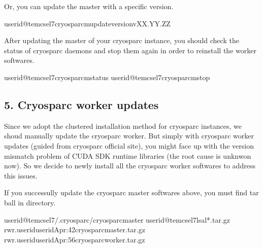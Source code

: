 \documentclass[a4paper,10pt,english]{sphinxmanual}
\begin{document}
\sphinxAtStartPar
Or, you can update the master with a specific version.

\begin{sphinxVerbatim}[commandchars=\\\{\}]
userid@tem\PYGZhy{}cs\PYGZhy{}el7\PYGZdl{}\PYGZgt{}cryosparcmupdate\PYGZhy{}\PYGZhy{}versionvXX.YY.ZZ
\end{sphinxVerbatim}

\sphinxAtStartPar
After updating the master of your cryosparc instance, you should check the status of cryosparc daemons and stop them again in order to re\sphinxhyphen{}install the worker softwares.

\begin{sphinxVerbatim}[commandchars=\\\{\}]
userid@tem\PYGZhy{}cs\PYGZhy{}el7\PYGZdl{}\PYGZgt{}cryosparcmstatus
userid@tem\PYGZhy{}cs\PYGZhy{}el7\PYGZdl{}\PYGZgt{}cryosparcmstop
\end{sphinxVerbatim}


\subsection{5. Cryosparc worker updates}
\label{\detokenize{faq:cryosparc-worker-updates}}
\sphinxAtStartPar
Since we adopt the clustered installation method for cryosparc instances, we shoud manually update the cryosparc worker.
But simply with cryosparc worker updates (guided from cryosparc official site), you might face up with the version mismatch problem of CUDA SDK runtime libraries (the root cause is unknwon now).
So we decide to newly install all the cryosparc worker softwares to address this issues.

\sphinxAtStartPar
If you successully update the cryosparc master softwares above,
you must find  tar ball in  directory.

\begin{sphinxVerbatim}[commandchars=\\\{\}]
userid@tem\PYGZhy{}cs\PYGZhy{}el7\PYGZdl{}\PYGZgt{}\PYGZti{}/.cryosparc/cryosparc\PYGZus{}master
userid@tem\PYGZhy{}cs\PYGZhy{}el7\PYGZdl{}\PYGZgt{}ls\PYGZhy{}al*.tar.gz
\PYGZhy{}rw\PYGZhy{}r\PYGZhy{}\PYGZhy{}\PYGZhy{}\PYGZhy{}\PYGZhy{}.useriduseridApr:42cryosparc\PYGZus{}master.tar.gz
\PYGZhy{}rw\PYGZhy{}r\PYGZhy{}\PYGZhy{}\PYGZhy{}\PYGZhy{}\PYGZhy{}.useriduseridApr:56cryosparc\PYGZus{}worker.tar.gz
\end{sphinxVerbatim}
\end{document}
